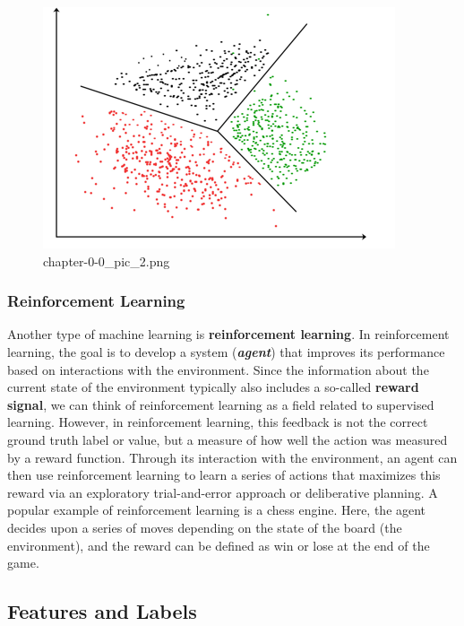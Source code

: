 \documentclass[11pt]{article}
\begin{document}
    \begin{figure}
\centering
\includegraphics{./pic/chapter-0-0_pic_2.png}
\caption{chapter-0-0\_pic\_2.png}
\end{figure}

    \hypertarget{reinforcement-learning}{%
\subsubsection{Reinforcement Learning}\label{reinforcement-learning}}

    Another type of machine learning is \textbf{reinforcement learning}. In
reinforcement learning, the goal is to develop a system
(\textbf{\emph{agent}}) that improves its performance based on
interactions with the environment. Since the information about the
current state of the environment typically also includes a so-called
\textbf{reward signal}, we can think of reinforcement learning as a
field related to supervised learning. However, in reinforcement
learning, this feedback is not the correct ground truth label or value,
but a measure of how well the action was measured by a reward function.
Through its interaction with the environment, an agent can then use
reinforcement learning to learn a series of actions that maximizes this
reward via an exploratory trial-and-error approach or deliberative
planning. A popular example of reinforcement learning is a chess engine.
Here, the agent decides upon a series of moves depending on the state of
the board (the environment), and the reward can be defined as win or
lose at the end of the game.

    \hypertarget{features-and-labels}{%
\subsection{Features and Labels}\label{features-and-labels}}
\end{document}
